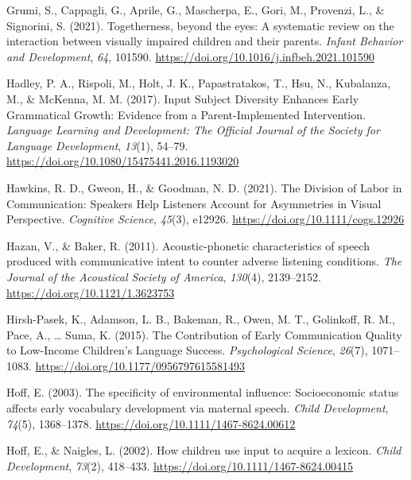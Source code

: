 \documentclass[
  man]{apa6}
\newlength{\cslhangindent}
\newlength{\cslentryspacingunit} %
\newenvironment{CSLReferences}[2] %
 {%
  \setlength{\parindent}{0pt}
  \ifodd #1
  \let\oldpar\par
  \def\par{\hangindent=\cslhangindent\oldpar}
  \fi
  \setlength{\parskip}{#2\cslentryspacingunit}
 }%
 {}
\begin{document}
\begin{CSLReferences}{1}{0}
\leavevmode{}%
Grumi, S., Cappagli, G., Aprile, G., Mascherpa, E., Gori, M., Provenzi, L., \& Signorini, S. (2021). Togetherness, beyond the eyes: {A} systematic review on the interaction between visually impaired children and their parents. \emph{Infant Behavior and Development}, \emph{64}, 101590. \url{https://doi.org/10.1016/j.infbeh.2021.101590}

\leavevmode{}%
Hadley, P. A., Rispoli, M., Holt, J. K., Papastratakos, T., Hsu, N., Kubalanza, M., \& McKenna, M. M. (2017). Input {Subject Diversity Enhances Early Grammatical Growth}: {Evidence} from a {Parent-Implemented Intervention}. \emph{Language Learning and Development: The Official Journal of the Society for Language Development}, \emph{13}(1), 54--79. \url{https://doi.org/10.1080/15475441.2016.1193020}

\leavevmode{}%
Hawkins, R. D., Gweon, H., \& Goodman, N. D. (2021). The {Division} of {Labor} in {Communication}: {Speakers Help Listeners Account} for {Asymmetries} in {Visual Perspective}. \emph{Cognitive Science}, \emph{45}(3), e12926. \url{https://doi.org/10.1111/cogs.12926}

\leavevmode{}%
Hazan, V., \& Baker, R. (2011). Acoustic-phonetic characteristics of speech produced with communicative intent to counter adverse listening conditions. \emph{The Journal of the Acoustical Society of America}, \emph{130}(4), 2139--2152. \url{https://doi.org/10.1121/1.3623753}

\leavevmode{}%
Hirsh-Pasek, K., Adamson, L. B., Bakeman, R., Owen, M. T., Golinkoff, R. M., Pace, A., \ldots{} Suma, K. (2015). The {Contribution} of {Early Communication Quality} to {Low-Income Children}'s {Language Success}. \emph{Psychological Science}, \emph{26}(7), 1071--1083. \url{https://doi.org/10.1177/0956797615581493}

\leavevmode{}%
Hoff, E. (2003). The specificity of environmental influence: Socioeconomic status affects early vocabulary development via maternal speech. \emph{Child Development}, \emph{74}(5), 1368--1378. \url{https://doi.org/10.1111/1467-8624.00612}

\leavevmode{}%
Hoff, E., \& Naigles, L. (2002). How children use input to acquire a lexicon. \emph{Child Development}, \emph{73}(2), 418--433. \url{https://doi.org/10.1111/1467-8624.00415}


\end{CSLReferences}
\end{document}
